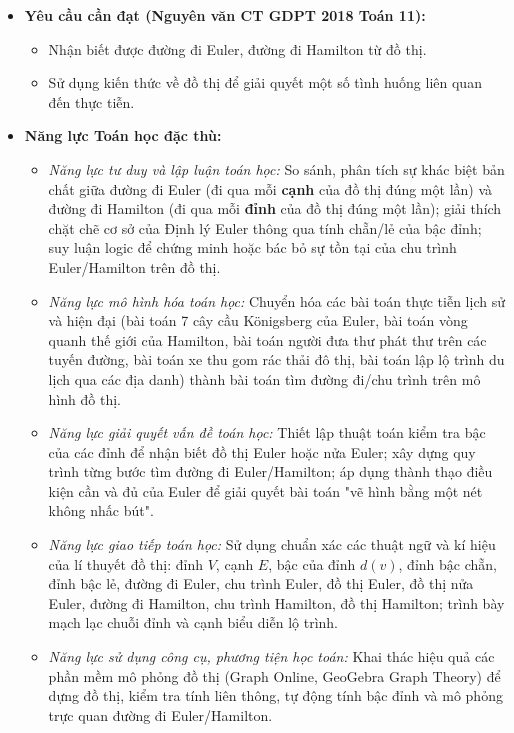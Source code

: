 \documentclass[12pt, a4paper]{article}
\begin{document}
\begin{itemize}[leftmargin=1.2cm]
    \item \textbf{Yêu cầu cần đạt (Nguyên văn CT GDPT 2018 Toán 11):}
    \begin{itemize}[leftmargin=0.6cm]
        \item Nhận biết được đường đi Euler, đường đi Hamilton từ đồ thị.
        \item Sử dụng kiến thức về đồ thị để giải quyết một số tình huống liên quan đến thực tiễn.
    \end{itemize}

    \item \textbf{Năng lực Toán học đặc thù:}
    \begin{itemize}[leftmargin=0.6cm]
        \item \textit{Năng lực tư duy và lập luận toán học:} So sánh, phân tích sự khác biệt bản chất giữa đường đi Euler (đi qua mỗi \textbf{cạnh} của đồ thị đúng một lần) và đường đi Hamilton (đi qua mỗi \textbf{đỉnh} của đồ thị đúng một lần); giải thích chặt chẽ cơ sở của Định lý Euler thông qua tính chẵn/lẻ của bậc đỉnh; suy luận logic để chứng minh hoặc bác bỏ sự tồn tại của chu trình Euler/Hamilton trên đồ thị.
        \item \textit{Năng lực mô hình hóa toán học:} Chuyển hóa các bài toán thực tiễn lịch sử và hiện đại (bài toán 7 cây cầu Königsberg của Euler, bài toán vòng quanh thế giới của Hamilton, bài toán người đưa thư phát thư trên các tuyến đường, bài toán xe thu gom rác thải đô thị, bài toán lập lộ trình du lịch qua các địa danh) thành bài toán tìm đường đi/chu trình trên mô hình đồ thị.
        \item \textit{Năng lực giải quyết vấn đề toán học:} Thiết lập thuật toán kiểm tra bậc của các đỉnh để nhận biết đồ thị Euler hoặc nửa Euler; xây dựng quy trình từng bước tìm đường đi Euler/Hamilton; áp dụng thành thạo điều kiện cần và đủ của Euler để giải quyết bài toán "vẽ hình bằng một nét không nhấc bút".
        \item \textit{Năng lực giao tiếp toán học:} Sử dụng chuẩn xác các thuật ngữ và kí hiệu của lí thuyết đồ thị: đỉnh $V$, cạnh $E$, bậc của đỉnh $d(v)$, đỉnh bậc chẵn, đỉnh bậc lẻ, đường đi Euler, chu trình Euler, đồ thị Euler, đồ thị nửa Euler, đường đi Hamilton, chu trình Hamilton, đồ thị Hamilton; trình bày mạch lạc chuỗi đỉnh và cạnh biểu diễn lộ trình.
        \item \textit{Năng lực sử dụng công cụ, phương tiện học toán:} Khai thác hiệu quả các phần mềm mô phỏng đồ thị (Graph Online, GeoGebra Graph Theory) để dựng đồ thị, kiểm tra tính liên thông, tự động tính bậc đỉnh và mô phỏng trực quan đường đi Euler/Hamilton.
    \end{itemize}


\end{itemize}
\end{document}
